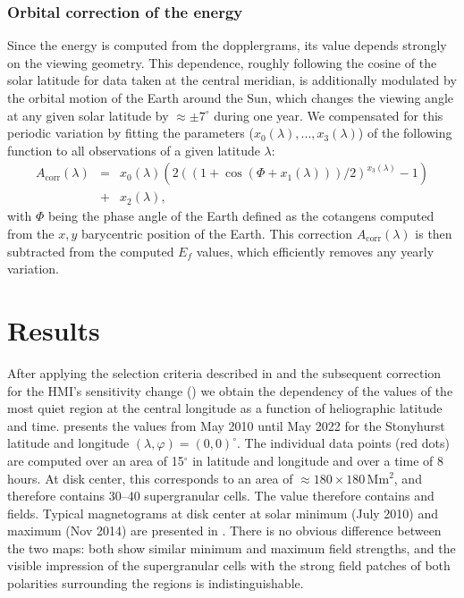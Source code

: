 \documentclass{aa}
\begin{document}
\subsubsection*{Orbital correction of the \fff{} 
energy}

Since the \fff
energy
is computed from the \los{} dopplergrams, its value depends strongly on the viewing geometry. This dependence,  roughly following the cosine of the solar latitude for data taken at the central meridian, is additionally modulated by the orbital motion of the Earth around the Sun, which changes the viewing angle at any given solar latitude by $\approx\pm7^\circ$ during one year. We compensated for this periodic variation by fitting the parameters ($x_0(\lambda), ..., x_3(\lambda)$) of the following function to all observations of a given latitude $\lambda$:
\begin{eqnarray}
\label{eq:orbitcorr}
A_{\mbox{corr}}(\lambda) &=& x_0(\lambda) (  2 ( (1+\cos(\Phi+x_1(\lambda)))/2)^{x_3(\lambda)}-1   )\nonumber \\
&+&x_2(\lambda),
\end{eqnarray}
with $\Phi$ being the phase angle of the Earth defined as the cotangens computed from the $x,y$ barycentric position of the Earth.
This correction $A_{\mbox{corr}}(\lambda)$ is then subtracted from the computed 
$E_f$ values, which efficiently removes any yearly variation. 

\section{Results}\label{results}

After applying the selection criteria described in  and the subsequent correction for the 
HMI's
sensitivity change () we obtain the dependency of the \brms{} values of the most quiet region at the central longitude as a function of heliographic latitude and time.  presents the \brms{} values from May 2010 until May 2022 for the 
Stonyhurst latitude and longitude $(\lambda,\varphi) = (0,0)^\circ$.
The individual data points (red dots) are computed over an area of 15$^\circ$ in latitude and longitude and over a time of 8 hours. At disk center, this corresponds to an area of $\approx 180 \times 180$\,Mm$^2$, and therefore contains 30--40 supergranular cells. The \brms{} value 
therefore contains
\NW{} and \IN{} fields.
Typical magnetograms at disk center at solar minimum (July 2010) and maximum (Nov 2014) are presented in . There is no obvious difference between the two maps: both show similar minimum and maximum field strengths, and the visible impression of the supergranular cells with the strong field patches of both polarities surrounding the \IN{} regions is indistinguishable.
\end{document}
